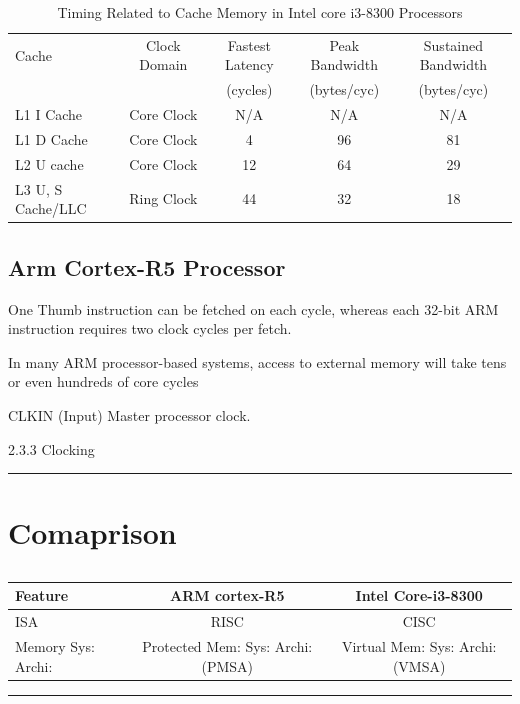 \documentclass[a4paper,11pt]{article}
\begin{document}
 \begin{table}[!h]
	\centering
	\begin{tabular}{l| c|c|c|c }
		Cache &Clock Domain&Fastest Latency&Peak Bandwidth&Sustained Bandwidth\\
		&&(cycles)&(bytes/cyc)&(bytes/cyc)\\\hline
		L1 I Cache&Core Clock &N/A&N/A&N/A\\
		L1 D Cache&Core Clock &4&96&81\\
		L2 U cache&Core Clock &12&64&29\\
		L3 U, S Cache/LLC&Ring Clock&44&32&18\\
		\hline\hline
	\end{tabular}
	\caption{Timing Related to Cache Memory in Intel core i3-8300 Processors\cite{iaorm}}
\end{table}

\subsection{Arm Cortex-R5 Processor} 
One Thumb instruction can be fetched on each cycle, whereas each
32-bit ARM instruction requires two clock cycles per fetch.

In many ARM
processor-based systems, access to external memory will take tens or even hundreds of core cycles


CLKIN (Input) Master processor clock.

2.3.3 Clocking




\vspace{1cm}\hrule
\section{Comaprison}
\begin{table}[!h]
	\centering
	\begin{tabular}{l ||c| c }
		\textbf{Feature} &\textbf{ARM cortex-R5}&\textbf{Intel Core-i3-8300}\\\hline
		ISA &RISC&CISC\\
		Memory Sys: Archi:&Protected Mem: Sys: Archi:(PMSA)&Virtual Mem: Sys: Archi:(VMSA)\\
		\hline\hline
	\end{tabular}
	\caption{}
\end{table}


\vspace{1cm}\hrule

\footnotesize

\end{document}
